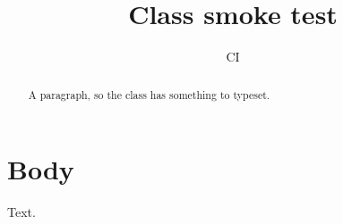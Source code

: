 \documentclass{elsarticle}
\begin{document}
\begin{frontmatter}
\title{Class smoke test}
\author{CI}
\begin{abstract}
A paragraph, so the class has something to typeset.
\end{abstract}
\end{frontmatter}

\section{Body}
Text.
\end{document}
